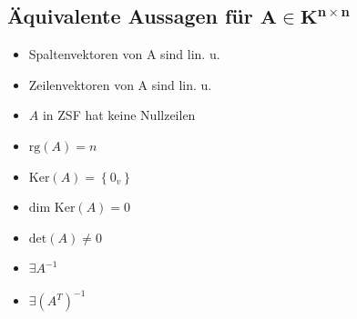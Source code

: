 \documentclass[10pt,a4paper]{article}
\begin{document}
\subsection{Äquivalente Aussagen für $\boldsymbol{A\in K^{n\times n}}$}
\begin{itemize}
\item Spaltenvektoren von A sind lin. u. 
\item Zeilenvektoren von A sind lin. u.
\item $A$ in ZSF hat keine Nullzeilen 
\item $\text{rg}(A)= n $
\item $\text{Ker}(A)=\left\lbrace 0_{v}\right\rbrace$
\item $\text{dim Ker}(A)=0$
\item $\text{det}(A)\neq 0$
\item $\exists A^{-1}$ 
\item $\exists (A^{T})^{-1}$
\end{itemize}
\end{document}
